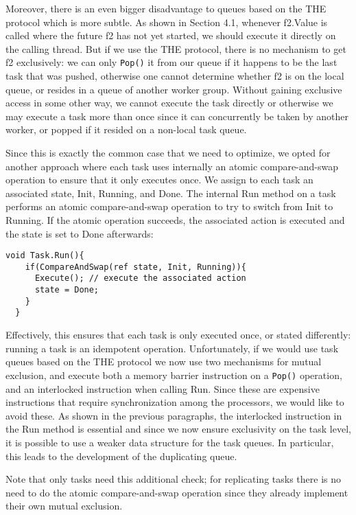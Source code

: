 Moreover, there is an even bigger disadvantage to queues based on the
THE protocol which is more subtle. As shown in Section 4.1, whenever
f2.Value is called where the future f2 has not yet started, we should
execute it directly on the calling thread. But if we use the THE
protocol, there is no mechanism to get f2 exclusively: we can only
\lstinline!Pop()! it from our queue if it happens to be the last task
that was pushed, otherwise one cannot determine whether f2 is on the
local queue, or resides in a queue of another worker group. Without
gaining exclusive access in some other way, we cannot execute the task
directly or otherwise we may execute a task more than once since it
can concurrently be taken by another worker, or popped if it resided
on a non-local task queue.

Since this is exactly the common case that we need to optimize, we
opted for another approach where each task uses internally an atomic
compare-and-swap operation to ensure that it only executes once. We
assign to each task an associated state, Init, Running, and Done. The
internal Run method on a task performs an atomic compare-and-swap
operation to try to switch from Init to Running. If the atomic
operation succeeds, the associated action is executed and the state is
set to Done afterwards:

\begin{lstlisting}[style=Listing]
  void Task.Run(){
    if(CompareAndSwap(ref state, Init, Running)){
      Execute(); // execute the associated action
      state = Done;
    }
  }
\end{lstlisting}

Effectively, this ensures that each task is only executed once, or
stated differently: running a task is an idempotent
operation. Unfortunately, if we would use task queues based on the THE
protocol we now use two mechanisms for mutual exclusion, and execute
both a memory barrier instruction on a \lstinline!Pop()! operation, and
an interlocked instruction when calling Run. Since these are expensive
instructions that require synchronization among the processors, we
would like to avoid these. As shown in the previous paragraphs, the
interlocked instruction in the Run method is essential and since we
now ensure exclusivity on the task level, it is possible to use a
weaker data structure for the task queues. In particular, this leads
to the development of the duplicating queue.

Note that only tasks need this additional check; for replicating tasks
there is no need to do the atomic compare-and-swap operation since
they already implement their own mutual exclusion.

